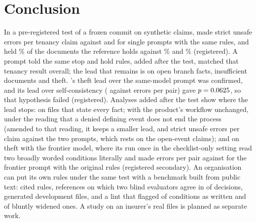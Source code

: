 \section{Conclusion}
\label{sec:conclusion}

In a pre-registered test of a frozen commit on synthetic claims, \casepath made \sthreeHTwoA{} strict unsafe errors per tenancy claim against \sthreeHTwoB{} and \sthreeHThreeB{} for single prompts with the same rules, and held \sthreeCasePathTenCorrectHold\% of the documents the reference holds against \sthreeRicTenCorrectHold\% and \sthreeRicFrontierTenCorrectHold\% (registered). A prompt told the same stop and hold rules, added after the test, matched that tenancy result overall; the lead that remains is on open branch facts, insufficient documents and theft. \casepath's theft lead over the same-model prompt was confirmed, and its lead over self-consistency (\sthreeHFourSCA{} against \sthreeHFourSCB{} errors per pair) gave $p= 0.0625$, so that hypothesis failed (registered). Analyses added after the test show where the lead stops: on files that state every fact; with the product's workflow unchanged, under the reading that a denied defining event does not end the process (amended to that reading, it keeps a smaller lead, \sthreeFFiveBAOneHTwoDiff{} and \sthreeFFiveBAOneHThreeDiff{} strict unsafe errors per claim against the two prompts, which rests on the \sthreeClaimsOpenEvent{} open-event claims); and on theft with the frontier model, where its run once in the checklist-only setting read two broadly worded conditions literally and made \sthreeSecSevenAA{} errors per pair against \sthreeRicOrigFrontierThErrors{} for the frontier prompt with the original rules (registered secondary). An organisation can put its own rules under the same test with a benchmark built from public text: \sfourdevAllRules{} cited rules, references on which two blind evaluators agree in \sfourdevCleanroomSame{} of \sfourdevCleanroomDocuments{} decisions, \sfourdevAllFiles{} generated development files, and a lint that flagged \sfourdevLintUntouchedFlagged{} of \sfourdevLintUntouched{} conditions as written and \sfourdevLintBluntDetected{} of \sfourdevLintBluntPlanted{} bluntly widened ones. A study on an insurer's real files is planned as separate work.
